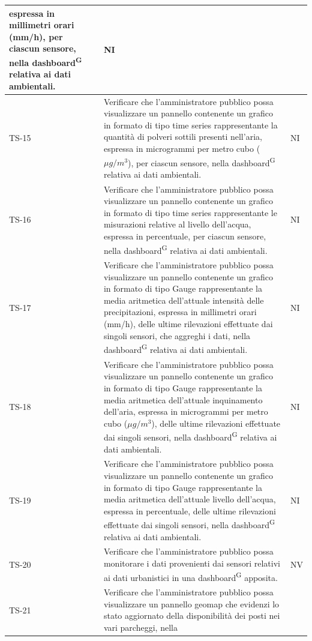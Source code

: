 \documentclass[8pt]{article}
\newcommand{\glossterm}[1]{#1\textsuperscript{G}} %
\begin{document}
\begin{longtable}{|>{\centering}p{2cm}|>{\RaggedRight}m{12cm}|>{\centering\arraybackslash}p{2cm}|}
    espressa in millimetri orari (mm/h), per ciascun sensore, nella \glossterm{dashboard} relativa ai dati ambientali.
    & NI \\
    \hline
    TS-15 & Verificare che l'amministratore pubblico possa visualizzare un pannello contenente
    un grafico in formato di tipo time series rappresentante la quantità di polveri sottili presenti nell'aria,
    espressa in microgrammi per metro cubo ($\mu g / m^3$), per ciascun sensore, nella \glossterm{dashboard} relativa ai dati ambientali.
    & NI \\
    \hline
    TS-16 & Verificare che l'amministratore pubblico possa visualizzare un pannello contenente
    un grafico in formato di tipo time series rappresentante le misurazioni relative al livello dell'acqua,
    espressa in percentuale, per ciascun sensore, nella \glossterm{dashboard} relativa ai dati ambientali.
    & NI \\
    \hline
    TS-17 & Verificare che l'amministratore pubblico possa visualizzare un pannello contenente
    un grafico in formato di tipo Gauge rappresentante la media aritmetica dell'attuale intensità delle precipitazioni,
    espressa in millimetri orari (mm/h), delle ultime rilevazioni effettuate dai singoli sensori, che aggreghi i dati, nella \glossterm{dashboard} relativa ai dati ambientali.
    & NI \\
    \hline
    TS-18 & Verificare che l'amministratore pubblico possa visualizzare un pannello contenente
    un grafico in formato di tipo Gauge rappresentante la media aritmetica dell'attuale inquinamento dell'aria,
    espressa in microgrammi per metro cubo ($\mu g / m^3$), delle ultime rilevazioni effettuate dai singoli sensori, nella \glossterm{dashboard} relativa ai dati ambientali.
    & NI \\
    \hline
    TS-19 & Verificare che l'amministratore pubblico possa visualizzare un pannello contenente
    un grafico in formato di tipo Gauge rappresentante la media aritmetica dell'attuale livello dell'acqua,
    espressa in percentuale, delle ultime rilevazioni effettuate dai singoli sensori, nella \glossterm{dashboard} relativa ai dati ambientali.
    & NI \\
    \hline
    TS-20 & Verificare che l'amministratore pubblico possa monitorare i dati provenienti
    dai sensori relativi ai dati urbanistici in una \glossterm{dashboard} apposita.
    & NV \\
    \hline
    TS-21 & Verificare che l'amministratore pubblico possa visualizzare un pannello geomap che evidenzi lo stato aggiornato della disponibilità dei posti nei vari parcheggi, nella

\end{longtable}
\end{document}

